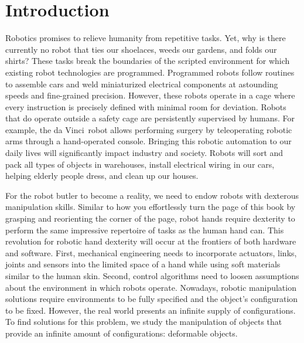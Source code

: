 \documentclass[\home/main.tex]{subfiles}
\begin{document}
\chapter{Introduction}\label{ch:introduction}
Robotics promises to relieve humanity from repetitive tasks. Yet, why is there currently no robot that ties our shoelaces, weeds our gardens, and folds our shirts?
These tasks break the boundaries of the scripted environment for which existing robot technologies are programmed. Programmed robots follow routines to assemble cars and weld miniaturized electrical components at astounding speeds and fine-grained precision. However, these robots operate in a cage where every instruction is precisely defined with minimal room for deviation. Robots that do operate outside a safety cage are persistently supervised by humans. For example, the da Vinci\textregistered\ robot allows performing surgery by teleoperating robotic arms through a hand-operated console.
Bringing this robotic automation to our daily lives will significantly impact industry and society. Robots will sort and pack all types of objects in warehouses, install electrical wiring in our cars, helping elderly people dress, and clean up our houses.

For the robot butler to become a reality, we need to endow robots with dexterous manipulation skills. Similar to how you effortlessly turn the page of this book by grasping and reorienting the corner of the page, robot hands require dexterity to perform the same impressive repertoire of tasks as the human hand can. This revolution for robotic hand dexterity will occur at the frontiers of both hardware and software. First, mechanical engineering needs to incorporate actuators, links, joints and sensors into the limited space of a hand while using soft materials similar to the human skin. Second, control algorithms need to loosen assumptions about the environment in which robots operate. Nowadays, robotic manipulation solutions require environments to be fully specified and the object's configuration to be fixed.
However, the real world presents an infinite supply of configurations.
To find solutions for this problem, we study the manipulation of objects that provide an infinite amount of configurations: deformable objects.
\end{document}
